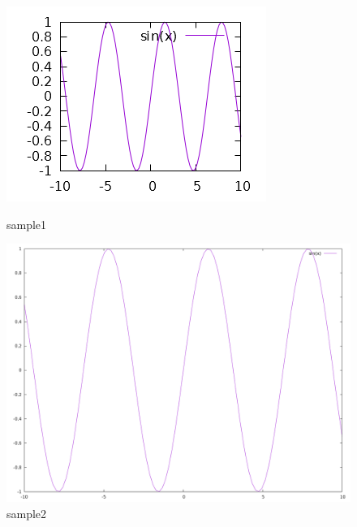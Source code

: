 \documentclass[lualatex]{jlreq}
\begin{document}
	\begin{figure}[H]
		\centering
		\begin{minipage}{0.4\columnwidth} %
			\centering
			\includegraphics[width=\columnwidth]{sample1.png}
			\caption{sample1}
			\label{fig:sample1}
		\end{minipage}
			\begin{minipage}{0.4\columnwidth} %
			\centering
			\includegraphics[width=\columnwidth]{sample2.png}
			\caption{sample2}
			\label{fig:sample2}
		\end{minipage}
	\end{figure}
\end{document}
